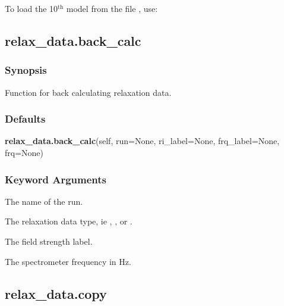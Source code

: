 

 To load the 10$^\mathrm{th}$ model from the file , use: 
  



  

 \newpage 

 \subsection{relax\_data.back\_calc} 

  
 \subsubsection{Synopsis} 

 Function for back calculating relaxation data. 
  

  
 \subsubsection{Defaults} 

 \textsf{\textbf{relax\_data.back\_calc}(self, run=None, ri\_label=None, frq\_label=None, frq=None)} 

  
 \subsubsection{Keyword Arguments} 

   The name of the run.   

   The relaxation data type, ie , , or .   

   The field strength label.   

   The spectrometer frequency in Hz.  

  

  

 \newpage 

 \subsection{relax\_data.copy} 

